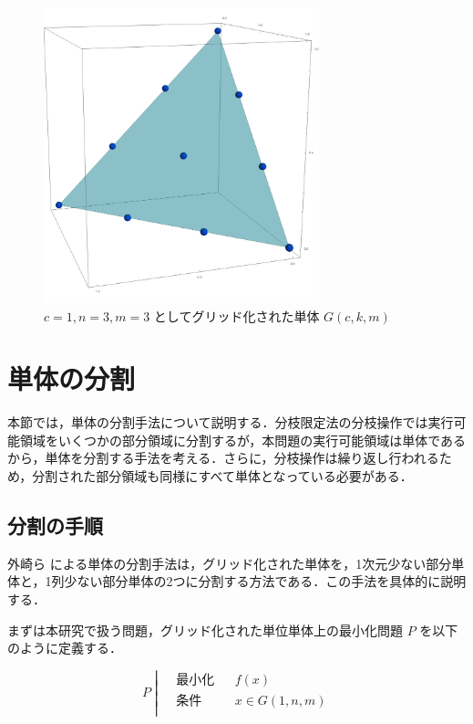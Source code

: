 \documentclass[a4paper,11pt]{jreport}
\begin{document}
\begin{figure}
\begin{center}
\includegraphics[width=8cm]{graphs/grid_simplex.png}
\caption{$ c=1, n=3, m=3 $ としてグリッド化された単体 $ G(c, k, m) $}
\label{fig:grid_simplex}
\end{center}
\end{figure}

\section{単体の分割} \label{sec:partition}

本節では，単体の分割手法について説明する．分枝限定法の分枝操作では実行可能領域をいくつかの部分領域に分割するが，本問題の実行可能領域は単体であるから，単体を分割する手法を考える．さらに，分枝操作は繰り返し行われるため，分割された部分領域も同様にすべて単体となっている必要がある．\par

\subsection{分割の手順}

外崎ら \cite{tonosaki} による単体の分割手法は，グリッド化された単体を，1次元少ない部分単体と，1列少ない部分単体の2つに分割する方法である．この手法を具体的に説明する．\par
まずは本研究で扱う問題，グリッド化された単位単体上の最小化問題 $ P $ を以下のように定義する．

$$
P \;
\left| \;
\begin{aligned}
& 最小化 && f(x) \\
& 条件 && x \in G(1, n, m) \\
\end{aligned}
\right.
$$
\end{document}
